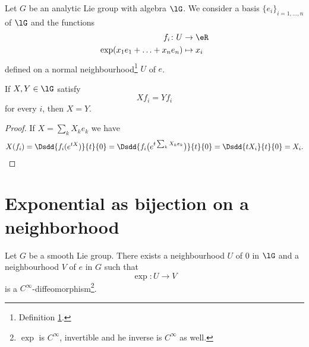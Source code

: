 \begin{lemma}       \label{LEMooWKFIooRHsrFX}
    Let \( G\) be an analytic Lie group with algebra \( \lG\). We consider a basis \( \{ e_i \}_{i=1,\ldots, n}\) of \( \lG\) and the functions
    \begin{equation}
        \begin{aligned}
            f_i\colon U&\to \eR \\
            \exp(x_1e_1+\ldots+x_ne_n)&\mapsto x_i 
        \end{aligned}
    \end{equation}
    defined on a normal neighbourhood\footnote{Definition \ref{}.} \( U\) of \( e\).
    
    If \( X,Y\in \lG\) satisfy
    \begin{equation}
        Xf_i=Yf_i
    \end{equation}
    for every \( i\), then \( X=Y\).
\end{lemma}

\begin{proof}
    If \( X=\sum_kX_ke_k\) we have
    \begin{equation}
        X(f_i)=\Dsdd{ f_i( e^{tX}) }{t}{0}=\Dsdd{ f_i\big(  e^{t\sum_kX_ke_k} \big) }{t}{0}=\Dsdd{ tX_i }{t}{0}=X_i.
    \end{equation}
\end{proof}



\section{Exponential as bijection on a neighborhood}

\begin{proposition}     \label{PROPooYFZZooLUOuOj}
    Let \( G\) be a smooth Lie group. There exists a neighbourhood \( U\) of \( 0\) in \( \lG\) and a neighbourhood \( V\) of \( e\) in \( G\) such that
    \begin{equation}
        \exp\colon U\to V
    \end{equation}
    is a \(  C^{\infty}\)-diffeomorphism\footnote{\( \exp\) is \(  C^{\infty}\), invertible and he inverse is \(  C^{\infty}\) as well.}.
\end{proposition}


